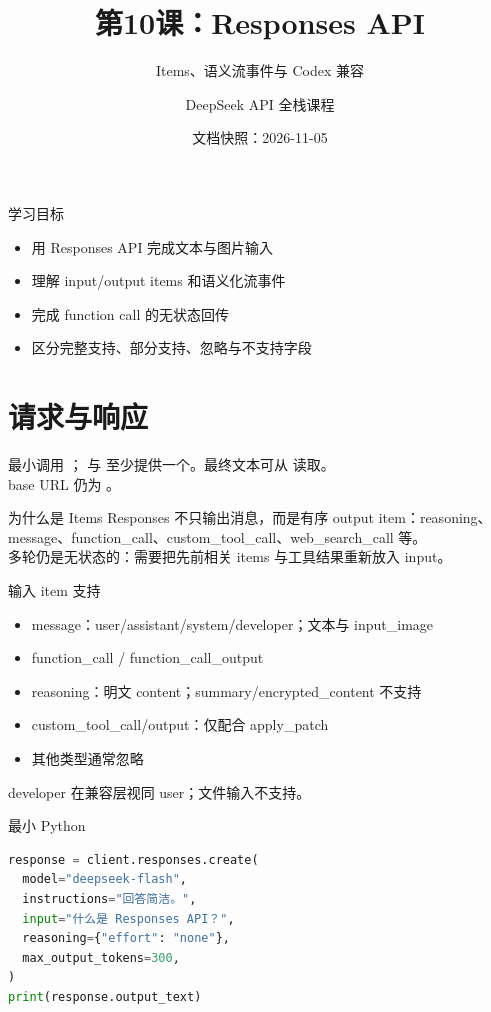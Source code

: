 \documentclass[aspectratio=169,UTF8]{ctexbeamer}
\title{第10课：Responses API}
\subtitle{Items、语义流事件与 Codex 兼容}
\author{DeepSeek API 全栈课程}
\date{文档快照：2026-11-05}
\begin{document}
\frame{\titlepage}
\begin{frame}{学习目标}
\begin{itemize}
  \item 用 Responses API 完成文本与图片输入
  \item 理解 input/output items 和语义化流事件
  \item 完成 function call 的无状态回传
  \item 区分完整支持、部分支持、忽略与不支持字段
\end{itemize}
\end{frame}
\section{请求与响应}
\begin{frame}{最小调用}
； 与  至少提供一个。最终文本可从  读取。\\[8pt]
base URL 仍为 。
\end{frame}
\begin{frame}{为什么是 Items}
Responses 不只输出消息，而是有序 output item：reasoning、message、function\_call、custom\_tool\_call、web\_search\_call 等。\\[8pt]
多轮仍是无状态的：需要把先前相关 items 与工具结果重新放入 input。
\end{frame}
\begin{frame}{输入 item 支持}
\small
\begin{itemize}
  \item message：user/assistant/system/developer；文本与 input\_image
  \item function\_call / function\_call\_output
  \item reasoning：明文 content；summary/encrypted\_content 不支持
  \item custom\_tool\_call/output：仅配合 apply\_patch
  \item 其他类型通常忽略
\end{itemize}
developer 在兼容层视同 user；文件输入不支持。
\end{frame}
\begin{frame}[fragile]{最小 Python}
\begin{lstlisting}[language=Python]
response = client.responses.create(
  model="deepseek-flash",
  instructions="回答简洁。",
  input="什么是 Responses API？",
  reasoning={"effort": "none"},
  max_output_tokens=300,
)
print(response.output_text)
\end{lstlisting}
\end{frame}
\end{document}
